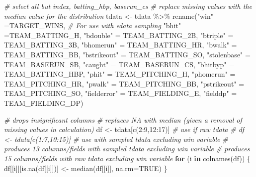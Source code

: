 \documentclass[
]{article}
\newenvironment{Shaded}{\begin{snugshade}}{\end{snugshade}}
\newcommand{\AttributeTok}[1]{\textcolor[rgb]{0.77,0.63,0.00}{#1}}
\newcommand{\CommentTok}[1]{\textcolor[rgb]{0.56,0.35,0.01}{\textit{#1}}}
\newcommand{\ConstantTok}[1]{\textcolor[rgb]{0.00,0.00,0.00}{#1}}
\newcommand{\ControlFlowTok}[1]{\textcolor[rgb]{0.13,0.29,0.53}{\textbf{#1}}}
\newcommand{\DecValTok}[1]{\textcolor[rgb]{0.00,0.00,0.81}{#1}}
\newcommand{\FunctionTok}[1]{\textcolor[rgb]{0.00,0.00,0.00}{#1}}
\newcommand{\NormalTok}[1]{#1}
\newcommand{\OtherTok}[1]{\textcolor[rgb]{0.56,0.35,0.01}{#1}}
\newcommand{\SpecialCharTok}[1]{\textcolor[rgb]{0.00,0.00,0.00}{#1}}
\newcommand{\StringTok}[1]{\textcolor[rgb]{0.31,0.60,0.02}{#1}}
\begin{document}
\begin{Shaded}
\begin{Highlighting}[]
\CommentTok{\# select all but index, batting\_hbp, baserun\_cs}
\CommentTok{\# replace missing values with the median value for the distribution}
\NormalTok{tdata }\OtherTok{\textless{}{-}}\NormalTok{ tdata }\SpecialCharTok{\%\textgreater{}\%}
  \FunctionTok{rename}\NormalTok{(}\StringTok{"win"} \OtherTok{=}\NormalTok{TARGET\_WINS, }\CommentTok{\# For use with edata sampling}
        \StringTok{"bhit"} \OtherTok{=}\NormalTok{TEAM\_BATTING\_H, }
        \StringTok{"bdouble"}  \OtherTok{=}\NormalTok{ TEAM\_BATTING\_2B, }
        \StringTok{"btriple"}  \OtherTok{=}\NormalTok{ TEAM\_BATTING\_3B, }
        \StringTok{"bhomerun"}  \OtherTok{=}\NormalTok{ TEAM\_BATTING\_HR, }
        \StringTok{"bwalk"}  \OtherTok{=}\NormalTok{ TEAM\_BATTING\_BB, }
        \StringTok{"bstrikeout"}  \OtherTok{=}\NormalTok{ TEAM\_BATTING\_SO, }
        \StringTok{"stolenbase"}  \OtherTok{=}\NormalTok{ TEAM\_BASERUN\_SB, }
        \StringTok{"caught"}  \OtherTok{=}\NormalTok{ TEAM\_BASERUN\_CS, }
        \StringTok{"bhitbyp"}  \OtherTok{=}\NormalTok{ TEAM\_BATTING\_HBP, }
        \StringTok{"phit"}  \OtherTok{=}\NormalTok{ TEAM\_PITCHING\_H, }
        \StringTok{"phomerun"}  \OtherTok{=}\NormalTok{ TEAM\_PITCHING\_HR, }
        \StringTok{"pwalk"}  \OtherTok{=}\NormalTok{ TEAM\_PITCHING\_BB, }
        \StringTok{"pstrikeout"}  \OtherTok{=}\NormalTok{ TEAM\_PITCHING\_SO, }
        \StringTok{"fielderror"}  \OtherTok{=}\NormalTok{ TEAM\_FIELDING\_E, }
        \StringTok{"fielddp"}  \OtherTok{=}\NormalTok{ TEAM\_FIELDING\_DP) }
\end{Highlighting}
\end{Shaded}

\begin{Shaded}
\begin{Highlighting}[]
\CommentTok{\# drops insignificant columns }
\CommentTok{\# replaces NA with median (given a removal of missing values in calculation)}
\NormalTok{df }\OtherTok{\textless{}{-}}\NormalTok{ tdata[}\FunctionTok{c}\NormalTok{(}\DecValTok{2}\SpecialCharTok{:}\DecValTok{9}\NormalTok{,}\DecValTok{12}\SpecialCharTok{:}\DecValTok{17}\NormalTok{)]          }\CommentTok{\# use if raw tdata}
\CommentTok{\# df \textless{}{-} tdata[c(1:7,10:15)] \# use with sampled tdata excluding win variable}
\CommentTok{\# produces 13 columns/fields with sampled tdata excluding win variable}
\CommentTok{\# produces 15 columns/fields with raw tdata excluding win variable}
\ControlFlowTok{for}\NormalTok{ (i }\ControlFlowTok{in} \FunctionTok{colnames}\NormalTok{(df)) \{}
\NormalTok{  df[[i]][}\FunctionTok{is.na}\NormalTok{(df[[i]])] }\OtherTok{\textless{}{-}} \FunctionTok{median}\NormalTok{(df[[i]], }\AttributeTok{na.rm=}\ConstantTok{TRUE}\NormalTok{)}
\NormalTok{\}}
\end{Highlighting}
\end{Shaded}
\end{document}
